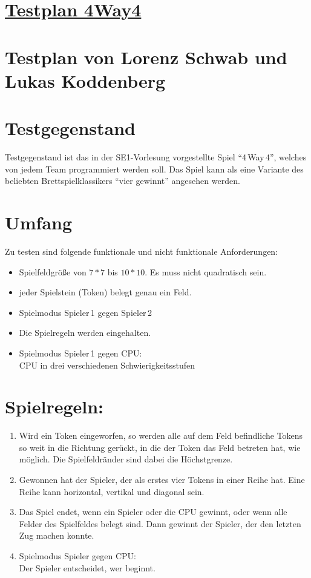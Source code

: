 \documentclass[a4paper, 12pt]{article}
\begin{document}
	\vspace*{\fill}
	{\centering \section*{{\underline{\Huge Testplan 4Way4}}}}\vspace{4ex}
	\section*{Testplan von Lorenz Schwab und Lukas Koddenberg}
	\vfill
	
	\pagebreak
	\section{Testgegenstand}
	Testgegenstand ist das in der SE1-Vorlesung vorgestellte Spiel \enquote{4\,Way\,4}, welches von jedem
	Team programmiert werden soll. Das Spiel kann als eine Variante des beliebten Brettspielklassikers
	\enquote{vier gewinnt} angesehen werden.
	
	\section{Umfang}
	Zu testen sind folgende funktionale und nicht funktionale Anforderungen:
	\begin{itemize}
		\item Spielfeldgröße von $7*7$ bis $10*10$. Es muss nicht quadratisch sein.
		\item jeder Spielstein (Token) belegt genau ein Feld.
		\item Spielmodus Spieler\,1 gegen Spieler\,2
		\item Die Spielregeln werden eingehalten.
		\item Spielmodus Spieler\,1 gegen CPU: \\
		CPU in drei verschiedenen Schwierigkeitsstufen
	\end{itemize}
	
	\section{Spielregeln: }
	\begin{enumerate}
		\item Wird ein Token eingeworfen, so werden alle auf dem Feld befindliche Tokens so weit in
		die Richtung gerückt, in die der Token das Feld betreten hat, wie möglich. Die Spielfeldränder sind
		dabei die Höchstgrenze.
		
		\item Gewonnen hat der Spieler, der als erstes vier Tokens in einer Reihe hat. Eine Reihe kann
		horizontal, vertikal und diagonal sein.
		
		\item Das Spiel endet, wenn ein Spieler oder die CPU gewinnt, oder wenn alle Felder des Spielfeldes
		belegt sind. Dann gewinnt der Spieler, der den letzten Zug machen konnte.
		
		\item Spielmodus Spieler gegen CPU: \\
		Der Spieler entscheidet, wer beginnt.
	\end{enumerate}
	
\end{document}
